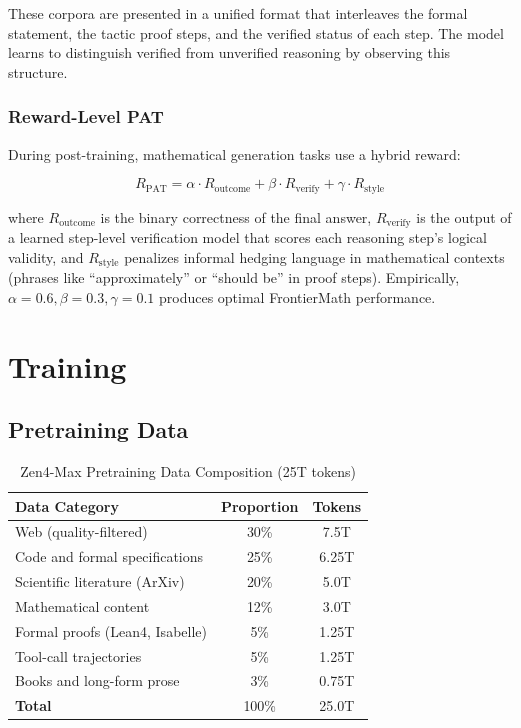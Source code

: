 \documentclass[11pt,a4paper]{article}
\begin{document}
These corpora are presented in a unified format that interleaves the formal statement,
the tactic proof steps, and the verified status of each step. The model learns to
distinguish verified from unverified reasoning by observing this structure.

\subsubsection{Reward-Level PAT}

During post-training, mathematical generation tasks use a hybrid reward:

\begin{equation}
R_{\text{PAT}} = \alpha \cdot R_{\text{outcome}} + \beta \cdot R_{\text{verify}} + \gamma \cdot R_{\text{style}}
\end{equation}

where $R_{\text{outcome}}$ is the binary correctness of the final answer, $R_{\text{verify}}$
is the output of a learned step-level verification model that scores each reasoning step's
logical validity, and $R_{\text{style}}$ penalizes informal hedging language in mathematical
contexts (phrases like ``approximately'' or ``should be'' in proof steps). Empirically,
$\alpha = 0.6, \beta = 0.3, \gamma = 0.1$ produces optimal FrontierMath performance.

\section{Training}

\subsection{Pretraining Data}

\begin{table}[H]
\centering
\begin{tabular}{lcc}
\toprule
\textbf{Data Category} & \textbf{Proportion} & \textbf{Tokens} \\
\midrule
Web (quality-filtered)          & 30\%  & 7.5T \\
Code and formal specifications  & 25\%  & 6.25T \\
Scientific literature (ArXiv)   & 20\%  & 5.0T \\
Mathematical content            & 12\%  & 3.0T \\
Formal proofs (Lean4, Isabelle) & 5\%   & 1.25T \\
Tool-call trajectories          & 5\%   & 1.25T \\
Books and long-form prose       & 3\%   & 0.75T \\
\midrule
\textbf{Total}                  & 100\% & 25.0T \\
\bottomrule
\end{tabular}
\caption{Zen4-Max Pretraining Data Composition (25T tokens)}
\end{table}
\end{document}
